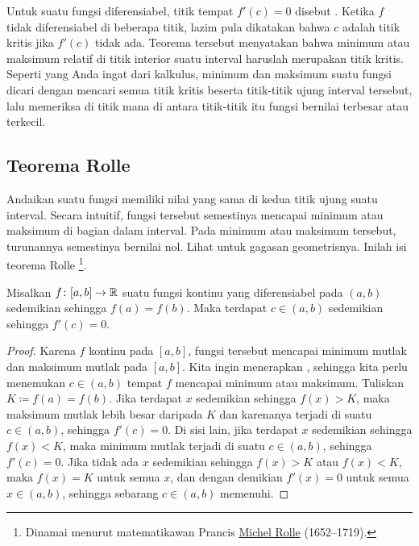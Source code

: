 Untuk suatu fungsi diferensiabel, titik tempat 
$f'(c) = 0$ disebut \emph{}.  Ketika $f$ tidak
diferensiabel di beberapa titik,
lazim pula dikatakan bahwa $c$ adalah titik kritis
jika $f'(c)$ tidak ada.
Teorema tersebut menyatakan bahwa minimum atau maksimum relatif di titik interior
suatu interval haruslah merupakan titik kritis.
Seperti yang Anda ingat dari kalkulus, minimum dan maksimum suatu fungsi dicari
dengan mencari semua titik kritis beserta titik-titik ujung
interval tersebut, lalu memeriksa di titik mana di antara titik-titik itu
fungsi bernilai terbesar atau terkecil.

\subsection{Teorema Rolle}

Andaikan suatu fungsi memiliki nilai yang sama di kedua titik ujung suatu interval.
Secara intuitif, fungsi tersebut semestinya mencapai minimum atau maksimum di bagian dalam
interval.
Pada minimum atau maksimum tersebut, turunannya semestinya bernilai nol.
Lihat  untuk gagasan geometrisnya.
Inilah isi teorema Rolle%
\footnote{Dinamai menurut matematikawan Prancis
\href{https://en.wikipedia.org/wiki/Michel_Rolle}{Michel Rolle}
(1652--1719).}.

\begin{myfigureht}
\caption{Titik tempat garis singgung horizontal, yaitu $f'(c) =
0$.\label{rollefig}}
\end{myfigureht}

\begin{thm}[Rolle] \label{thm:rolle}
Misalkan $f \colon [a,b] \to {\mathbb{R}}$ suatu fungsi kontinu
yang diferensiabel pada $(a,b)$ sedemikian sehingga $f(a) = f(b)$.
Maka terdapat $c \in (a,b)$ sedemikian sehingga $f'(c) = 0$.
\end{thm}

\begin{proof}
Karena $f$ kontinu pada $[a,b]$, fungsi tersebut mencapai minimum mutlak dan
maksimum mutlak pada $[a,b]$.  Kita ingin menerapkan ,
sehingga kita perlu menemukan $c \in (a,b)$ tempat $f$ mencapai minimum atau
maksimum.
Tuliskan $K \coloneqq f(a) = f(b)$.
Jika terdapat $x$ sedemikian sehingga $f(x) > K$, maka maksimum mutlak
lebih besar daripada $K$ dan karenanya terjadi di suatu $c \in (a,b)$,
sehingga $f'(c) = 0$.  Di sisi lain, jika terdapat $x$
sedemikian sehingga $f(x) < K$, maka minimum mutlak terjadi di suatu
$c \in (a,b)$, sehingga $f'(c) = 0$.  Jika tidak ada $x$ sedemikian sehingga
$f(x) > K$ atau
$f(x) < K$, maka $f(x) = K$ untuk semua $x$, dan dengan demikian
$f'(x) = 0$ untuk semua $x \in (a,b)$, sehingga sebarang $c \in (a,b)$ memenuhi.
\end{proof}

